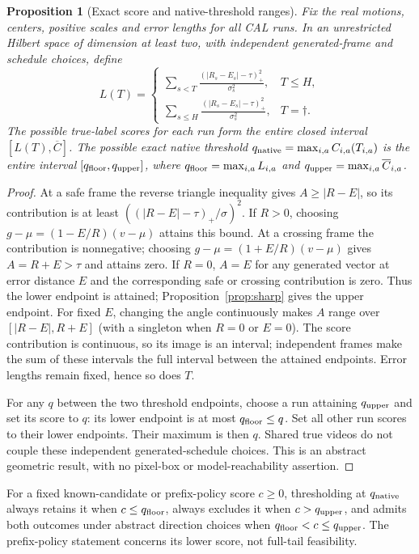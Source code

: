 \documentclass[11pt]{article}
\theoremstyle{noteplain}
\newtheorem{proposition}{Proposition}
\newcommand{\dd}{\dagger}
\begin{document}
\begin{proposition}[Exact score and native-threshold ranges]\label{prop:floor}
Fix the real motions, centers, positive scales and error lengths for all CAL runs. In an unrestricted Hilbert space of dimension at least two, with independent generated-frame and schedule choices, define
\[
 L(T)=\begin{cases}
 \displaystyle\sum_{s<T}\frac{(|R_s-E_s|-\tau)_+^2}{\sigma_s^2},&T\le H,\\[3pt]
 \displaystyle\sum_{s\le H}\frac{(|R_s-E_s|-\tau)_+^2}{\sigma_s^2},&T=\dd.
 \end{cases}
\]
The possible true-label scores for each run form the entire closed interval $[L(T),\overline C]$. The possible exact native threshold $q_{\rm native}=\max_{i,a}C_{i,a}(T_{i,a})$ is the entire interval $[q_{\rm floor},q_{\rm upper}]$, where $q_{\rm floor}=\max_{i,a}L_{i,a}$ and $q_{\rm upper}=\max_{i,a}\overline C_{i,a}$.
\end{proposition}
\begin{proof}
At a safe frame the reverse triangle inequality gives $A\ge|R-E|$, so its contribution is at least $((|R-E|-\tau)_+/\sigma)^2$. If $R>0$, choosing $g-\mu=(1-E/R)(v-\mu)$ attains this bound. At a crossing frame the contribution is nonnegative; choosing $g-\mu=(1+E/R)(v-\mu)$ gives $A=R+E>\tau$ and attains zero. If $R=0$, $A=E$ for any generated vector at error distance $E$ and the corresponding safe or crossing contribution is zero. Thus the lower endpoint is attained; Proposition~\ref{prop:sharp} gives the upper endpoint. For fixed $E$, changing the angle continuously makes $A$ range over $[|R-E|,R+E]$ (with a singleton when $R=0$ or $E=0$). The score contribution is continuous, so its image is an interval; independent frames make the sum of these intervals the full interval between the attained endpoints. Error lengths remain fixed, hence so does $T$.

For any $q$ between the two threshold endpoints, choose a run attaining $q_{\rm upper}$ and set its score to $q$: its lower endpoint is at most $q_{\rm floor}\le q$. Set all other run scores to their lower endpoints. Their maximum is then $q$. Shared true videos do not couple these independent generated-schedule choices. This is an abstract geometric result, with no pixel-box or model-reachability assertion.
\end{proof}
For a fixed known-candidate or prefix-policy score $c\ge0$, thresholding at $q_{\rm native}$ always retains it when $c\le q_{\rm floor}$, always excludes it when $c>q_{\rm upper}$, and admits both outcomes under abstract direction choices when $q_{\rm floor}<c\le q_{\rm upper}$. The prefix-policy statement concerns its lower score, not full-tail feasibility.
\end{document}
